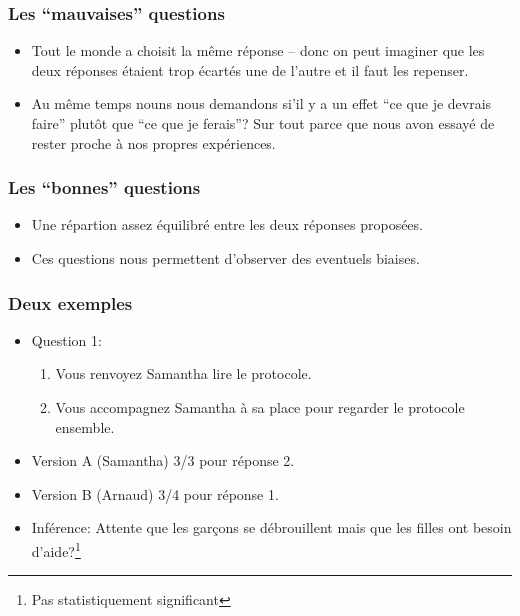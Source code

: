 \documentclass{beamer}
\begin{document}
\begin{frame}
  \frametitle{Les ``mauvaises'' questions}
  \begin{itemize}
  \item Tout le monde a choisit la même réponse -- donc on peut imaginer que les deux réponses étaient
  trop écartés une de l'autre et il faut les repenser.
  \item Au même temps nouns nous demandons si'il y a un effet ``ce que je devrais faire'' plutôt que ``ce que 
  je ferais''? Sur tout parce que nous avon essayé de rester proche à nos propres expériences.
  \end{itemize}
\end{frame}

\begin{frame}
  \frametitle{Les ``bonnes'' questions}
  \begin{itemize}
  \item Une répartion assez équilibré entre les deux réponses proposées.
  \item Ces questions nous permettent d'observer des eventuels biaises.
  \end{itemize}
\end{frame}

\begin{frame}
  \frametitle{Deux exemples}
  \begin{itemize}
  \item Question 1:
    \begin{enumerate}
    \item Vous renvoyez Samantha lire le protocole. 
    \item Vous accompagnez Samantha à sa place pour regarder le protocole ensemble. 
    \end{enumerate}
  \item Version A (Samantha) 3/3 pour réponse 2.
  \item Version B (Arnaud) 3/4 pour réponse 1.
  \item Inférence: Attente que les garçons se débrouillent mais que les filles ont
    besoin d'aide?\footnote{Pas statistiquement significant} 
  \end{itemize}
\end{frame}
\end{document}
